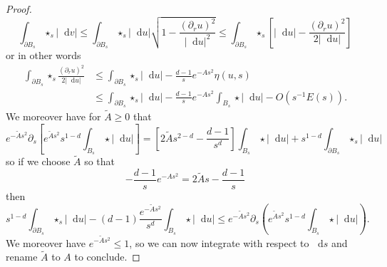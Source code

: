 \documentclass[final,12pt, leqno]{brownthesis}
\newcommand*\dif{\mathop{}\!\mathrm{d}}
\theoremstyle{definition}
\numberwithin{equation}{section}
\begin{document}
\begin{proof}
$$\int_{\partial B_s} \star_s |\dif v| \leq \int_{\partial B_s} \star_s |\dif u| \sqrt{1 - \frac{(\partial_r u)^2}{|\dif u|^2}} \leq \int_{\partial B_s} \star_s \left[|\dif u| - \frac{(\partial_r u)^2}{2 |\dif u|}\right]$$
or in other words
\begin{align*}
\int_{\partial B_s} \star_s \frac{(\partial_r u)^2}{2|\dif u|} &\leq \int_{\partial B_s} \star_s |\dif u| - \frac{d - 1}{s} e^{-As^2} \eta(u, s)\\
&\leq \int_{\partial B_s} \star_s |\dif u| - \frac{d - 1}{s} e^{-As^2} \int_{B_s} \star |\dif u| - O(s^{-1}E(s)).
\end{align*}
We moreover have for $\tilde A \geq 0$ that
$$e^{-\tilde As^2} \partial_s \left[e^{\tilde As^2} s^{1 - d} \int_{B_s} \star |\dif u|\right] = \left[2\tilde As^{2 - d} - \frac{d - 1}{s^d}\right]\int_{B_s} \star |\dif u| + s^{1 - d} \int_{\partial B_s} \star_s |\dif u|$$
so if we choose $\tilde A$ so that
$$-\frac{d - 1}{s} e^{-As^2} = 2\tilde As - \frac{d - 1}{s}$$
then
$$s^{1 - d} \int_{\partial B_s} \star_s |\dif u| - (d - 1)\frac{e^{-\tilde As^2}}{s^d} \int_{B_s} \star|\dif u| \leq e^{-\tilde As^2} \partial_s\left(e^{\tilde As^2} s^{1 - d} \int_{B_s} \star|\dif u|\right).$$
We moreover have $e^{-\tilde As^2} \leq 1$, so we can now integrate with respect to $\dif s$ and rename $\tilde A$ to $A$ to conclude.
\end{proof}
\end{document}
